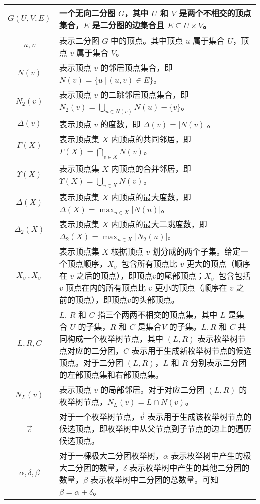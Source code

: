 \begin{longtable}[htbp]{|c|p{12cm}|}
    $G(U,V,E)$ & 一个无向二分图 $G$，其中 $U$ 和 $V$ 是两个不相交的顶点集合，$E$ 是二分图的边集合且 $E \subseteq U \times V$。 \\ \hline
    $u,v$ & 表示二分图 $G$ 中的顶点。其中顶点 $u$ 属于集合 $U$，顶点 $v$ 属于集合 $V$。 \\ \hline
    $N(v)$ & 表示顶点 $v$ 的邻居顶点集合，即 $N(v) = \{u \,|\, (u,v) \in E\}$。 \\ \hline
    $N_2(v)$ & 表示顶点 $v$ 的二跳邻居顶点集合，即 $N_2(v) = \bigcup_{u \in N(v)} N(u) - \{v\}$。 \\ \hline
    $\Delta(v)$ & 表示顶点 $v$ 的度数，即 $\Delta(v) = |N(v)|$。 \\ \hline
    $\Gamma(X)$ & 表示顶点集 $X$ 内顶点的共同邻居，即 $\Gamma(X) = \bigcap_{v \in X} N(v)$。 \\ \hline
    $\Upsilon(X)$ & 表示顶点集 $X$ 内顶点的合并邻居，即 $\Upsilon(X) = \bigcup_{v \in X} N(v)$。 \\ \hline
    $\Delta(X)$ & 表示顶点集 $X$ 内顶点的最大度数，即 $\Delta(X) = \max_{u \in X} |N(u)|$。 \\ \hline
    $\Delta_2(X)$ & 表示顶点集 $X$ 内顶点的最大二跳度数，即 $\Delta_2(X) = \max_{u \in X} |N_2(u)|$。 \\ \hline
    $X_v^+, X_v^-$ & 表示顶点集 $X$ 根据顶点 $v$ 划分成的两个子集。给定一个顶点顺序，$X_v^+$ 包含所有顶点比 $v$ 更大的顶点（顺序在 $v$ 之后的顶点），即顶点$v$的尾部顶点；$X_v^-$ 包含包括 $v$ 顶点在内的所有顶点比 $v$ 更小的顶点（顺序在 $v$ 之前的顶点），即顶点$v$的头部顶点。 \\ \hline
    $L,R,C$ & $L$, $R$ 和 $C$ 指三个两两不相交的顶点集，其中 $L$ 是集合 $U$ 的子集，$R$ 和 $C$ 是集合$V$ 的子集。$L,R$ 和 $C$ 共同构成一个枚举树节点，其中 $(L,R)$ 表示枚举树节点对应的二分团，$C$ 表示用于生成新枚举树节点的候选顶点。对于二分团 $(L,R)$，$L$ 和 $R$ 分别表示二分团的左部顶点集和右部顶点集。 \\ \hline
    $N_L(v)$ & 表示顶点 $v$ 的局部邻居。对于对应二分团 $(L,R)$ 的枚举树节点，$N_L(v) = L \cap N(v)$。 \\ \hline
    $\vec{v}$ & 对于一个枚举树节点，$\vec{v}$ 表示用于生成该枚举树节点的候选顶点，即枚举树中从父节点到子节点的边上的遍历候选顶点。 \\ \hline
    $\alpha, \delta, \beta$ & 对于一棵极大二分团枚举树，$\alpha$ 表示枚举树中产生的极大二分团的数量，$\delta$ 表示枚举树中产生的其他二分团的数量，$\beta$ 表示枚举树中二分团的总数量。可知 $\beta = \alpha + \delta$。 \\ \hline
\end{longtable}

